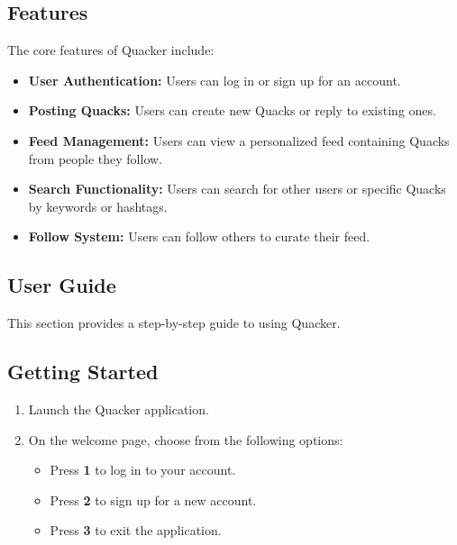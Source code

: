 \documentclass[11pt]{article}
\begin{document}
\subsection{Features}
The core features of Quacker include:
\begin{itemize}
    \item \textbf{User Authentication:} Users can log in or sign up for an account.
    \item \textbf{Posting Quacks:} Users can create new Quacks or reply to existing ones.
    \item \textbf{Feed Management:} Users can view a personalized feed containing Quacks from people they follow.
    \item \textbf{Search Functionality:} Users can search for other users or specific Quacks by keywords or hashtags.
    \item \textbf{Follow System:} Users can follow others to curate their feed.
\end{itemize}

\subsection{User Guide}
This section provides a step-by-step guide to using Quacker.

\subsection*{Getting Started}
\begin{enumerate}
    \item Launch the Quacker application.
    \item On the welcome page, choose from the following options:
        \begin{itemize}
            \item Press \textbf{1} to log in to your account.
            \item Press \textbf{2} to sign up for a new account.
            \item Press \textbf{3} to exit the application.
        \end{itemize}
\end{enumerate}
\end{document}
